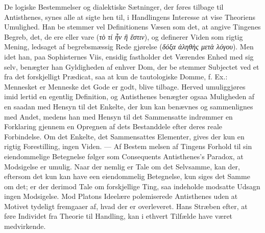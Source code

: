 \documentclass[12pt,a4paper]{book}
\newcommand{\gk}[1]{\textit{#1}}
\begin{document}
De logiske Bestemmelser og dialektiske Sætninger, der
føres tilbage til Antisthenes, synes alle at sigte hen til, i
Handlingens Interesse at vise Theoriens Umulighed. Han be\-%
stemmer vel Definitionens Væsen som det, at angive Tingenes
Begreb, det, de ere eller vare (\gk{τὸ τί ἦν ἢ ἔστιν}), og definerer
Viden som rigtig Mening, ledsaget af begrebsmæssig Rede\-%
gjørelse (\gk{δόξα ἀληθὴς μετὰ λόγου}). Men idet han, paa
Sophisternes Viis, ensidig fastholder det Værendes Enhed med
sig selv, benægter han Gyldigheden af enhver Dom, der be\-%
stemmer Subjectet ved et fra det forskjelligt Prædicat, saa at
kun de tautologiske Domme, f. Ex.: Mennesket er Menneske
det Gode er godt, blive tilbage. Herved umuliggjøres imid\-%
lertid en egentlig Definition, og Antisthenes benægter ogsaa
Muligheden af en saadan med Hensyn til det Enkelte, der
kun kan benævnes og sammenlignes med Andet, medens han
med Hensyn til det Sammensatte indrømmer en Forklaring
gjennem en Opregnen af dets Bestanddele efter deres reale
Forbindelse. Om det Enkelte, det Sammensattes Elementer,
gives der kun en rigtig Forestilling, ingen Viden. --- Af Bestem\-%
melsen af Tingens Forhold til sin eiendommelige Betegnelse
følger som Consequents Antisthenes's Paradox, at Modsigelse
er umulig. Naar der nemlig er Tale om det Selvsamme, kan der,
eftersom det kun kan have een eiendommelig Betegnelse, kun
siges det Samme om det; er der derimod Tale om forskjellige
Ting, saa indeholde modsatte Udsagn ingen Modsigelse. Mod
Platons Ideelære polemiserede Antisthenes uden at Motivet
tydeligt fremgaaer af, hvad der er overleveret. Hans Stræben
efter, at føre Individet fra Theorie til Handling, kan i ethvert
Tilfælde have været medvirkende.
\end{document}
